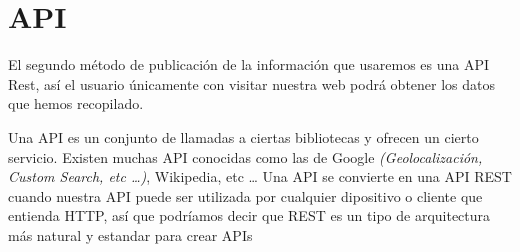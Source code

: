 %
%
%
%
%

\chapter{API}

El segundo método de publicación de la información que usaremos es una API Rest, así el usuario únicamente con visitar nuestra web podrá obtener los datos que hemos recopilado.

Una API es un conjunto de llamadas a ciertas bibliotecas y ofrecen un cierto servicio. Existen muchas API conocidas como las de Google \textit{(Geolocalización, Custom Search, etc \ldots)}, Wikipedia, etc \ldots 
\linebreak
Una API se convierte en una API REST cuando nuestra API puede ser utilizada por cualquier dipositivo o cliente que entienda HTTP, así que podríamos decir que REST es un tipo de arquitectura más natural y estandar para crear APIs


